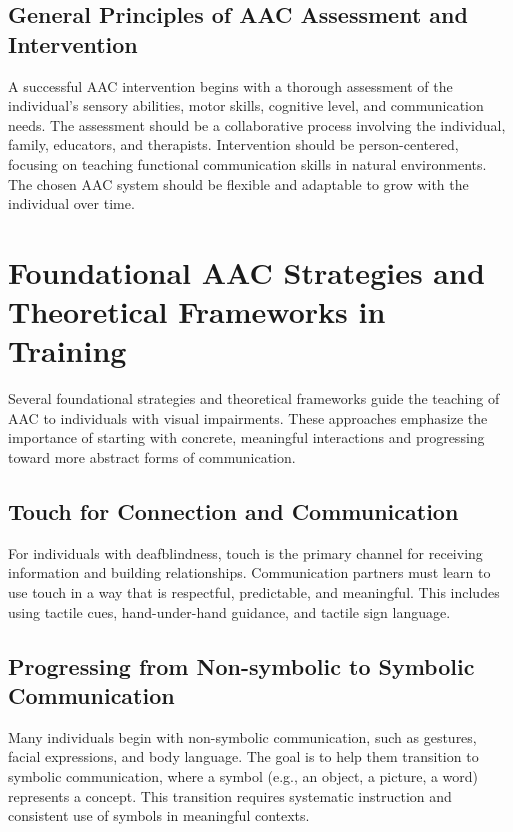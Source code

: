 \subsection{General Principles of AAC Assessment and Intervention}\label{app6:aac-principles}
A successful AAC intervention begins with a thorough assessment of the individual's sensory abilities, motor skills, cognitive level, and communication needs. The assessment should be a collaborative process involving the individual, family, educators, and therapists. Intervention should be person-centered, focusing on teaching functional communication skills in natural environments. The chosen AAC system should be flexible and adaptable to grow with the individual over time.

\section{Foundational AAC Strategies and Theoretical Frameworks in Training}\label{app6:aac-frameworks}
Several foundational strategies and theoretical frameworks guide the teaching of AAC to individuals with visual impairments. These approaches emphasize the importance of starting with concrete, meaningful interactions and progressing toward more abstract forms of communication.

\subsection{Touch for Connection and Communication}\label{app6:touch-comm}
For individuals with deafblindness, touch is the primary channel for receiving information and building relationships. Communication partners must learn to use touch in a way that is respectful, predictable, and meaningful. This includes using \gls{tactile} cues, hand-under-hand guidance, and \gls{tactile} sign language.

\subsection{Progressing from Non-symbolic to Symbolic Communication}\label{app6:symbolic-comm}
Many individuals begin with non-symbolic communication, such as gestures, facial expressions, and body language. The goal is to help them transition to symbolic communication, where a symbol (e.g., an object, a picture, a word) represents a concept. This transition requires systematic instruction and consistent use of symbols in meaningful contexts.

